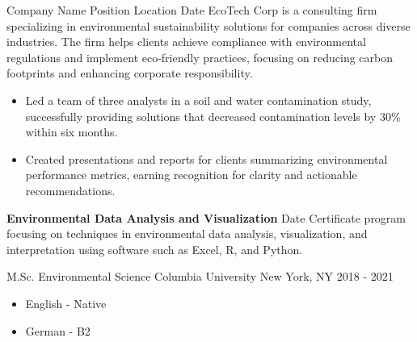 \documentclass[10pt, a4paper]{cvhari}
\begin{document}
	\company
	{Company Name}
	{Position}
	{Location}
	{Date}
	\smallskip
	EcoTech Corp is a consulting firm specializing in environmental sustainability solutions for companies across diverse industries. The firm helps clients achieve compliance with environmental regulations and implement eco-friendly practices, focusing on reducing carbon footprints and enhancing corporate responsibility.
	\smallskip
	\begin{itemize}
		\item Led a team of three analysts in a soil and water contamination study, successfully providing solutions that decreased contamination levels by 30\% within six months.
		\item Created presentations and reports for clients summarizing environmental performance metrics, earning recognition for clarity and actionable recommendations.
	\end{itemize}
	
	
	\medskip
	
	\medskip
	\medskip
	
	\medskip
	\cvachievement{\certificatesymbol}
	{{\bfseries Environmental Data Analysis and Visualization}}
	{Date}
	{Certificate program focusing on techniques in environmental data analysis, visualization, and interpretation using software such as Excel, R, and Python.}\par
	
	\medskip
	
	
	\begin{multicols}{2}
		\medskip
		
		\education
		{M.Sc. Environmental Science}
		{Columbia University}
		{New York, NY}
		{2018 - 2021}
		\par
		
		\columnbreak
		\medskip
		\begin{itemize}
			\item English - Native
			\item German - B2
		\end{itemize}
	\end{multicols}
	
\end{document}
